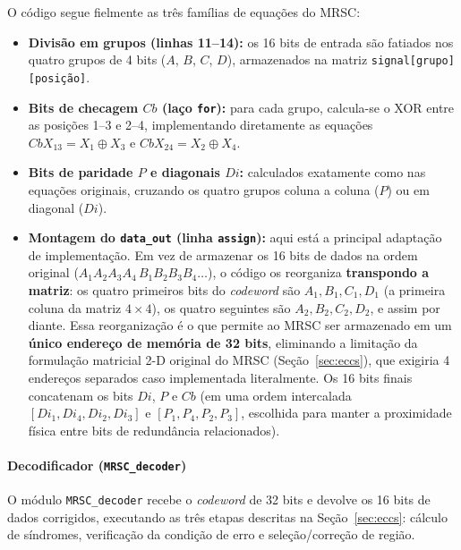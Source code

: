 \documentclass[12pt,a4paper]{article}
\begin{document}
O código segue fielmente as três famílias de equações do MRSC:

\begin{itemize}
    \item \textbf{Divisão em grupos (linhas 11--14):} os 16 bits de entrada são 
    fatiados nos quatro grupos de 4 bits ($A$, $B$, $C$, $D$), armazenados na 
    matriz \texttt{signal[grupo][posição]}.
    
    \item \textbf{Bits de checagem $Cb$ (laço \texttt{for}):} para cada grupo, 
    calcula-se o XOR entre as posições 1--3 e 2--4, implementando diretamente 
    as equações $CbX_{13} = X_1 \oplus X_3$ e $CbX_{24} = X_2 \oplus X_4$.
    
    \item \textbf{Bits de paridade $P$ e diagonais $Di$:} calculados exatamente 
    como nas equações originais, cruzando os quatro grupos coluna a coluna 
    ($P$) ou em diagonal ($Di$).
    
    \item \textbf{Montagem do \texttt{data\_out} (linha \texttt{assign}):} aqui 
    está a principal adaptação de implementação. Em vez de armazenar os 16 
    bits de dados na ordem original ($A_1A_2A_3A_4\,B_1B_2B_3B_4\ldots$), o 
    código os reorganiza \textbf{transpondo a matriz}: os quatro primeiros 
    bits do \textit{codeword} são $A_1, B_1, C_1, D_1$ (a primeira coluna da 
    matriz $4\times4$), os quatro seguintes são $A_2, B_2, C_2, D_2$, e assim 
    por diante. Essa reorganização é o que permite ao MRSC ser armazenado em 
    um \textbf{único endereço de memória de 32 bits}, eliminando a limitação 
    da formulação matricial 2-D original do MRSC (Seção~\ref{sec:eccs}), que 
    exigiria 4 endereços separados caso implementada literalmente. Os 16 bits finais concatenam os bits $Di$, $P$ e 
    $Cb$ (em uma ordem intercalada $[Di_1, Di_4, Di_2, Di_3]$ e 
    $[P_1, P_4, P_2, P_3]$, escolhida para manter a proximidade física entre 
    bits de redundância relacionados).
\end{itemize}

\paragraph{Decodificador (\texttt{MRSC\_decoder})}

O módulo \texttt{MRSC\_decoder} recebe o \textit{codeword} de 32 bits e 
devolve os 16 bits de dados corrigidos, executando as três etapas descritas 
na Seção~\ref{sec:eccs}: cálculo de síndromes, verificação da condição de 
erro e seleção/correção de região.
\end{document}
